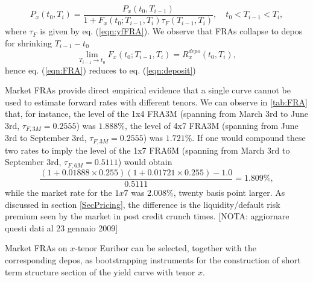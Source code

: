 \documentclass[11pt,reqno]{amsart}
\begin{document}
\begin{equation}
P_x\left(t_0,T_i\right) = \frac{P_x\left(t_0,T_{i-1}\right)}{1+F_{x}\left(t_0;T_{i-1},T_{i}\right)\tau_F\left(T_{i-1},T_{i}\right) },\quad t_0<T_{i-1}<T_i,
\label{eqn:FRA}
\end{equation}
where $\tau_F$ is given by eq. (\ref{eqn:yfFRA}). We observe that FRAs collapse to depos for shrinking $T_{i-1}-t_0$
\begin{equation}
\lim_{T_{i-1} \to t_0}F_{x}\left(t_0;T_{i-1},T_{i}\right) = R^{depo}_x\left(t_0,T_i\right),
\end{equation}
hence eq. (\ref{eqn:FRA}) reduces to eq. (\ref{eqn:deposit})
\par
Market FRAs provide direct empirical evidence that a single curve cannot be used to estimate forward rates with different tenors. We can observe in \ref{tab:FRA} that, for instance, the level of the 1x4 FRA3M (spanning from March 3rd to June 3rd, $\tau_{F,3M} = 0.2555$) was $1.888\%$, the level of 4x7 FRA3M (spanning from June 3rd to September 3rd, $\tau_{F,3M} = 0.2555$) was $1.721\%$. If one would compound these two rates to imply the level of the 1x7 FRA6M (spanning from March 3rd to September 3rd, $\tau_{F,6M} = 0.5111$) would obtain
\begin{equation}
\frac{
    \left(1 + 0.01888 \times 0.255\right) \left(1 + 0.01721 \times 0.255\right) - 1.0}
    {0.5111 }
    = 1.809\%,
\label{eqn:FRAarbitrage}
\end{equation}
while the market rate for the $1x7$ was $2.008\%$, twenty basis point larger. As discussed in section \ref{SecPricing}, the difference is the liquidity/default risk premium seen by the market in post credit crunch times. [NOTA: aggiornare questi dati al 23 gennaio 2009]
\par
Market FRAs on $x$-tenor Euribor can be selected, together with the corresponding depos, as bootstrapping instruments for the construction of short term structure section of the yield curve with tenor $x$.
\end{document}
